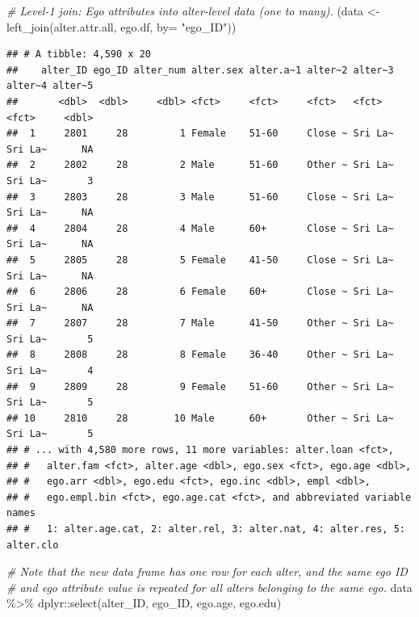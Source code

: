 \documentclass[
]{book}
\newenvironment{Shaded}{\begin{snugshade}}{\end{snugshade}}
\newcommand{\AttributeTok}[1]{\textcolor[rgb]{0.77,0.63,0.00}{#1}}
\newcommand{\CommentTok}[1]{\textcolor[rgb]{0.56,0.35,0.01}{\textit{#1}}}
\newcommand{\FunctionTok}[1]{\textcolor[rgb]{0.00,0.00,0.00}{#1}}
\newcommand{\NormalTok}[1]{#1}
\newcommand{\OtherTok}[1]{\textcolor[rgb]{0.56,0.35,0.01}{#1}}
\newcommand{\SpecialCharTok}[1]{\textcolor[rgb]{0.00,0.00,0.00}{#1}}
\newcommand{\StringTok}[1]{\textcolor[rgb]{0.31,0.60,0.02}{#1}}
\begin{document}
\begin{Shaded}
\begin{Highlighting}[]
\CommentTok{\# Level{-}1 join: Ego attributes into alter{-}level data (one to many).}
\NormalTok{(data }\OtherTok{\textless{}{-}} \FunctionTok{left\_join}\NormalTok{(alter.attr.all, ego.df, }\AttributeTok{by=} \StringTok{"ego\_ID"}\NormalTok{))}
\end{Highlighting}
\end{Shaded}

\begin{verbatim}
## # A tibble: 4,590 x 20
##    alter_ID ego_ID alter_num alter.sex alter.a~1 alter~2 alter~3 alter~4 alter~5
##       <dbl>  <dbl>     <dbl> <fct>     <fct>     <fct>   <fct>   <fct>     <dbl>
##  1     2801     28         1 Female    51-60     Close ~ Sri La~ Sri La~      NA
##  2     2802     28         2 Male      51-60     Other ~ Sri La~ Sri La~       3
##  3     2803     28         3 Male      51-60     Close ~ Sri La~ Sri La~      NA
##  4     2804     28         4 Male      60+       Close ~ Sri La~ Sri La~      NA
##  5     2805     28         5 Female    41-50     Close ~ Sri La~ Sri La~      NA
##  6     2806     28         6 Female    60+       Close ~ Sri La~ Sri La~      NA
##  7     2807     28         7 Male      41-50     Other ~ Sri La~ Sri La~       5
##  8     2808     28         8 Female    36-40     Other ~ Sri La~ Sri La~       4
##  9     2809     28         9 Female    51-60     Other ~ Sri La~ Sri La~       5
## 10     2810     28        10 Male      60+       Other ~ Sri La~ Sri La~       5
## # ... with 4,580 more rows, 11 more variables: alter.loan <fct>,
## #   alter.fam <fct>, alter.age <dbl>, ego.sex <fct>, ego.age <dbl>,
## #   ego.arr <dbl>, ego.edu <fct>, ego.inc <dbl>, empl <dbl>,
## #   ego.empl.bin <fct>, ego.age.cat <fct>, and abbreviated variable names
## #   1: alter.age.cat, 2: alter.rel, 3: alter.nat, 4: alter.res, 5: alter.clo
\end{verbatim}

\begin{Shaded}
\begin{Highlighting}[]
\CommentTok{\# Note that the new data frame has one row for each alter, and the same ego ID}
\CommentTok{\# and ego attribute value is repeated for all alters belonging to the same ego.}
\NormalTok{data }\SpecialCharTok{\%\textgreater{}\%} 
\NormalTok{  dplyr}\SpecialCharTok{::}\FunctionTok{select}\NormalTok{(alter\_ID, ego\_ID, ego.age, ego.edu)}
\end{Highlighting}
\end{Shaded}
\end{document}

